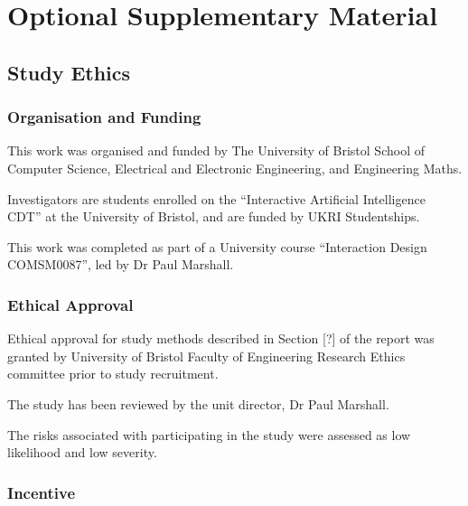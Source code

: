 \documentclass[manuscript,screen,review]{acmart}
\begin{document}
\newpage



\appendix

\section{Optional Supplementary Material}

\subsection{Study Ethics}

\subsubsection{Organisation and Funding}


This work was organised and funded by The University of Bristol School of Computer Science, Electrical and Electronic Engineering, and Engineering Maths.

Investigators are students enrolled on the “Interactive Artificial Intelligence CDT” at the University of Bristol, and are funded by UKRI Studentships.

This work was completed as part of a University course “Interaction Design COMSM0087”, led by Dr Paul Marshall.


\subsubsection{Ethical Approval} 


Ethical approval for study methods described in Section [?] of the report was granted by University of Bristol Faculty of Engineering Research Ethics committee prior to study recruitment.

The study has been reviewed by the unit director, Dr Paul Marshall.

The risks associated with participating in the study were assessed as low likelihood and low severity. 

\subsubsection{Incentive}  
\end{document}
